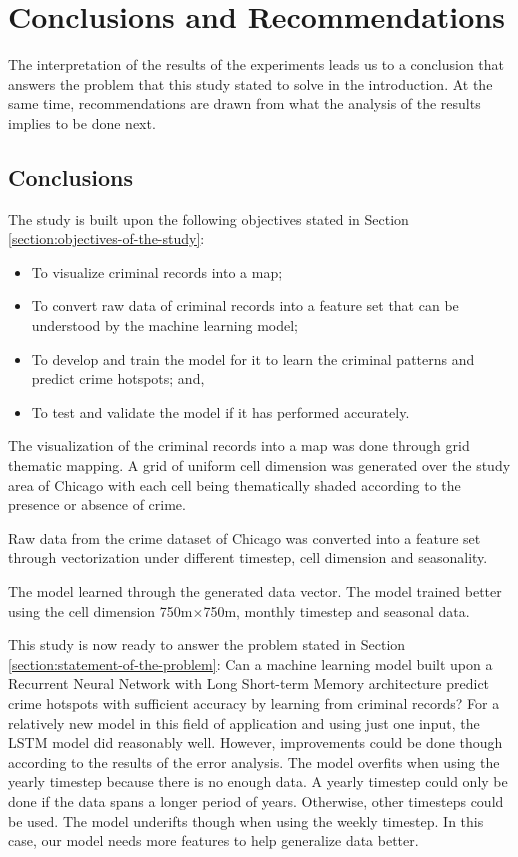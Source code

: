 \section{Conclusions and Recommendations}
    The interpretation of the results of the experiments leads us to a conclusion that answers the problem that this study stated to solve in the introduction. At the same time, recommendations are drawn from what the analysis of the results implies to be done next.

\subsection{Conclusions}
    The study is built upon the following objectives stated in Section \ref{section:objectives-of-the-study}:
    \begin{itemize}
        \item To visualize criminal records into a map;
        \item To convert raw data of criminal records into a feature set that can be understood by the machine learning model;
        \item To develop and train the model for it to learn the criminal patterns and predict crime hotspots; and,
        \item To test and validate the model if it has performed accurately.
    \end{itemize}

    The visualization of the criminal records into a map was done through grid thematic mapping. A grid of uniform cell dimension was generated over the study area of Chicago with each cell being thematically shaded according to the presence or absence of crime.

    Raw data from the crime dataset of Chicago was converted into a feature set through vectorization under different timestep, cell dimension and seasonality.

    The model learned through the generated data vector. The model trained better using the cell dimension 750m\(\times\)750m, monthly timestep and seasonal data.

    This study is now ready to answer the problem stated in Section \ref{section:statement-of-the-problem}: Can a machine learning model built upon a Recurrent Neural Network with Long Short-term Memory architecture predict crime hotspots with sufficient accuracy by learning from criminal records? For a relatively new model in this field of application and using just one input, the LSTM model did reasonably well. However, improvements could be done though according to the results of the error analysis. The model overfits when using the yearly timestep because there is no enough data. A yearly timestep could only be done if the data spans a longer period of years. Otherwise, other timesteps could be used. The model underifts though when using the weekly timestep. In this case, our model needs more features to help generalize data better.
